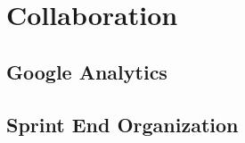 \chapter{Collaboration}\label{chap:collaboration}

\section{Google Analytics}


\section{Sprint End Organization}\label{sec:collab:sprintend}
